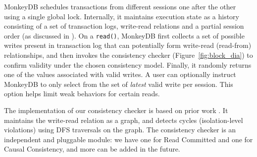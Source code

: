 MonkeyDB schedules transactions from different sessions
one after the other using a single global lock.
Internally, it maintains execution state as a history consisting of a set of transaction logs, 
write-read relations and a partial session order (as discussed in ).
On a {\tt read()}, MonkeyDB first collects a set of possible writes present in transaction log 
that can potentially form write-read (read-from) relationships, and then 
invokes the consistency checker (Figure~\ref{fig:block_dia}) to confirm
validity under the chosen consistency model.
Finally, it randomly returns one of the values associated with valid writes.
A user can optionally instruct MonkeyDB to only select
from the set of \textit{latest} valid write per session. This option helps limit weak behaviors
for certain reads.


The implementation of our consistency checker is based on prior work
\cite{DBLP:journals/pacmpl/BiswasE19}. It maintains 
the write-read relation as a graph, and detects cycles (isolation-level
violations) using DFS traversals on the graph. The consistency checker is an independent 
and pluggable module: we have one for Read Committed and one for Causal
Consistency, and more can be added in the future.





